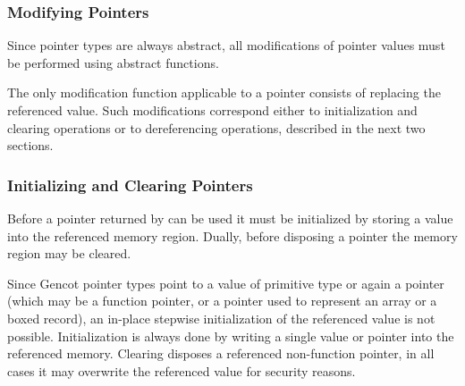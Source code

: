 \subsubsection{Modifying Pointers}

Since pointer types are always abstract, all modifications of pointer values must be performed using abstract functions.

The only modification function applicable to a pointer consists of replacing the referenced value. Such modifications correspond
either to initialization and clearing operations or to dereferencing operations, described in the next two sections.

\subsubsection{Initializing and Clearing Pointers}

Before a pointer returned by  can be used it must be initialized by storing a value into the referenced memory region.
Dually, before disposing a pointer the memory region may be cleared.

Since Gencot pointer types  point to a value of primitive type or again a pointer (which may be a function pointer,
or a pointer used to represent an array or a boxed record), an in-place
stepwise initialization of the referenced value is not possible. Initialization is always done by writing a single value or pointer
into the referenced memory. Clearing disposes a referenced non-function pointer, in all cases it may overwrite the referenced value
for security reasons.

